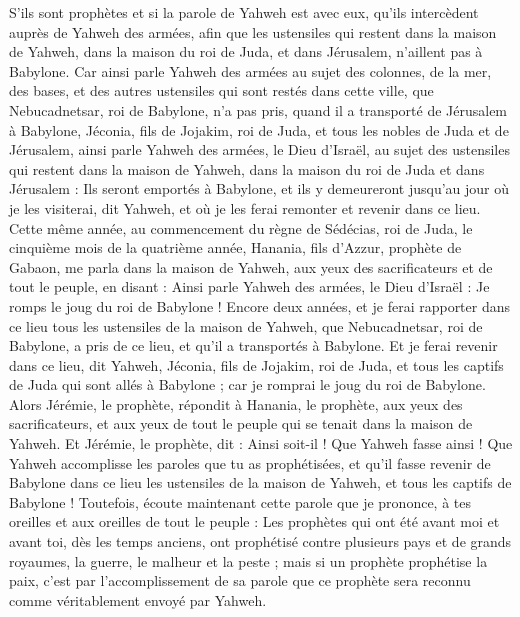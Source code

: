 \begin{multicols}{2}
S'ils sont prophètes et si la parole de Yahweh est avec eux, qu'ils intercèdent auprès de Yahweh des armées, afin que les ustensiles qui restent dans la maison de Yahweh, dans la maison du roi de Juda, et dans Jérusalem, n'aillent pas à Babylone.
Car ainsi parle Yahweh des armées au sujet des colonnes, de la mer, des bases, et des autres ustensiles qui sont restés dans cette ville,
que Nebucadnetsar, roi de Babylone, n'a pas pris, quand il a transporté de Jérusalem à Babylone, Jéconia, fils de Jojakim, roi de Juda, et tous les nobles de Juda et de Jérusalem,
ainsi parle Yahweh des armées, le Dieu d'Israël, au sujet des ustensiles qui restent dans la maison de Yahweh, dans la maison du roi de Juda et dans Jérusalem :
Ils seront emportés à Babylone, et ils y demeureront jusqu’au jour où je les visiterai, dit Yahweh, et où je les ferai remonter et revenir dans ce lieu.
\VerseOne{}Cette même année, au commencement du règne de Sédécias, roi de Juda, le cinquième mois de la quatrième année, Hanania, fils d’Azzur, prophète de Gabaon, me parla dans la maison de Yahweh, aux yeux des sacrificateurs et de tout le peuple, en disant :
Ainsi parle Yahweh des armées, le Dieu d'Israël : Je romps le joug du roi de Babylone !
Encore deux années, et je ferai rapporter dans ce lieu tous les ustensiles de la maison de Yahweh, que Nebucadnetsar, roi de Babylone, a pris de ce lieu, et qu’il a transportés à Babylone.
Et je ferai revenir dans ce lieu, dit Yahweh, Jéconia, fils de Jojakim, roi de Juda, et tous les captifs de Juda qui sont allés à Babylone ; car je romprai le joug du roi de Babylone.
Alors Jérémie, le prophète, répondit à Hanania, le prophète, aux yeux des sacrificateurs, et aux yeux de tout le peuple qui se tenait dans la maison de Yahweh.
Et Jérémie, le prophète, dit : Ainsi soit-il ! Que Yahweh fasse ainsi ! Que Yahweh accomplisse les paroles que tu as prophétisées, et qu'il fasse revenir de Babylone dans ce lieu les ustensiles de la maison de Yahweh, et tous les captifs de Babylone !
Toutefois, écoute maintenant cette parole que je prononce, à tes oreilles et aux oreilles de tout le peuple :
Les prophètes qui ont été avant moi et avant toi, dès les temps anciens, ont prophétisé contre plusieurs pays et de grands royaumes, la guerre, le malheur et la peste ;
mais si un prophète prophétise la paix, c’est par l’accomplissement de sa parole que ce prophète sera reconnu comme véritablement envoyé par Yahweh.

\end{multicols}
